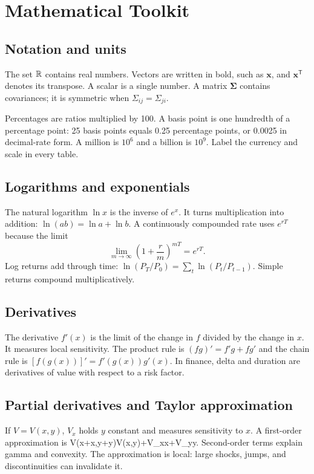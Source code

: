 \chapter{Mathematical Toolkit}

\section{Notation and units}
The set $\mathbb{R}$ contains real numbers. Vectors are written in bold, such as $\mathbf{x}$, and $\mathbf{x}^{\mathsf T}$ denotes its transpose. A scalar is a single number. A matrix $\boldsymbol\Sigma$ contains covariances; it is symmetric when $\Sigma_{ij}=\Sigma_{ji}$.

Percentages are ratios multiplied by 100. A basis point is one hundredth of a percentage point: 25 basis points equals 0.25 percentage points, or 0.0025 in decimal-rate form. A million is $10^6$ and a billion is $10^9$. Label the currency and scale in every table.

\section{Logarithms and exponentials}
The natural logarithm $\ln x$ is the inverse of $e^x$. It turns multiplication into addition: $\ln(ab)=\ln a+\ln b$. A continuously compounded rate uses $e^{rT}$ because the limit
\[\lim_{m\to\infty}\left(1+\frac{r}{m}\right)^{mT}=e^{rT}.\]
Log returns add through time: $\ln(P_T/P_0)=\sum_t\ln(P_t/P_{t-1})$. Simple returns compound multiplicatively.

\section{Derivatives}
The derivative $f'(x)$ is the limit of the change in $f$ divided by the change in $x$. It measures local sensitivity. The product rule is $(fg)'=f'g+fg'$ and the chain rule is $[f(g(x))]'=f'(g(x))g'(x)$. In finance, delta and duration are derivatives of value with respect to a risk factor.

\section{Partial derivatives and Taylor approximation}
If $V=V(x,y)$, $V_x$ holds $y$ constant and measures sensitivity to $x$. A first-order approximation is
  V(x+\Delta x,y+\Delta y)\approx V(x,y)+V_x\Delta x+V_y\Delta y.
\closeformula
Second-order terms explain gamma and convexity. The approximation is local: large shocks, jumps, and discontinuities can invalidate it.

